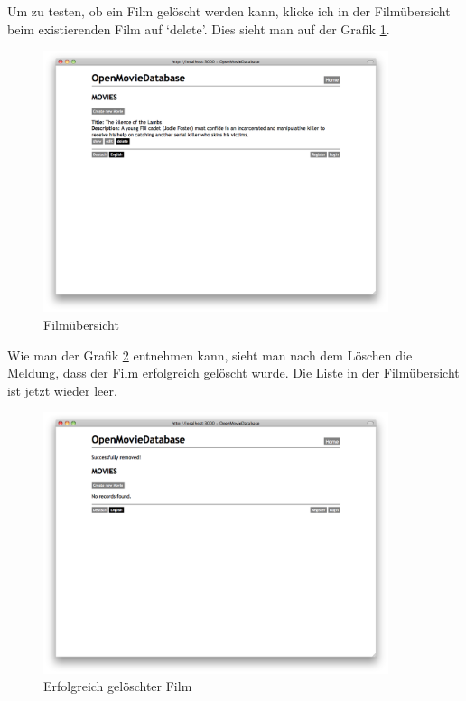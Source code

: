\clearpage

Um zu testen, ob ein Film gelöscht werden kann, klicke ich in der Filmübersicht
beim existierenden Film auf `delete'. Dies sieht man auf der Grafik \ref{test_movie_05}.

\begin{figure}[ht]
    \begin{center}
        \includegraphics[width=0.9\textwidth,angle=0]{./bilder/tests/test_movie_05.png}
        \caption{Filmübersicht}
        \label{test_movie_05}
    \end{center}
\end{figure}

Wie man der Grafik \ref{test_movie_06} entnehmen kann, sieht man nach dem Löschen
die Meldung, dass der Film erfolgreich gelöscht wurde. Die Liste in der
Filmübersicht ist jetzt wieder leer.

\begin{figure}[ht]
    \begin{center}
        \includegraphics[width=0.9\textwidth,angle=0]{./bilder/tests/test_movie_06.png}
        \caption{Erfolgreich gelöschter Film}
        \label{test_movie_06}
    \end{center}
\end{figure}

